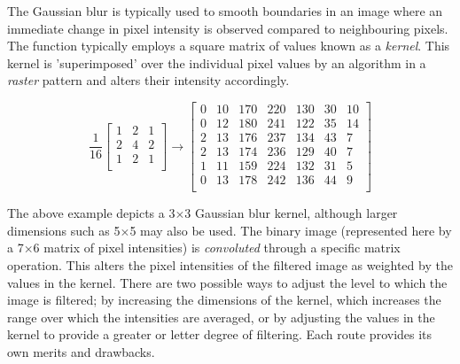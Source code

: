 \documentclass{article}
\begin{document}
	\noindent The Gaussian blur is typically used to smooth boundaries in an image where an immediate change in pixel intensity is observed compared to neighbouring pixels. The function typically employs a square matrix of values known as a \textit{kernel}. This kernel is 'superimposed' over the individual pixel values by an algorithm in a \textit{raster} pattern and alters their intensity accordingly.
	
	\[
	\frac{1}{16}
	\begin{bmatrix} 
		1 & 2 & 1 \\
		2 & 4 & 2\\
		1 & 2 & 1 \\
	\end{bmatrix}
	\longrightarrow
	\begin{bmatrix}
		0 & 10 & 170 & 220 & 130 & 30 & 10\\
		0 & 12 & 180 & 241 & 122 & 35 & 14\\
		2 & 13 & 176 & 237 & 134 & 43 & 7\\
		2 & 13 & 174 & 236 & 129 & 40 & 7\\
		1 & 11 & 159 & 224 & 132 & 31 & 5\\
		0 & 13 & 178 & 242 & 136 & 44 & 9\\
	\end{bmatrix}
	\]
	
	\noindent The above example depicts a 3$\times$3 Gaussian blur kernel, although larger dimensions such as 5$\times$5 may also be used. The binary image (represented here by a 7$\times$6 matrix of pixel intensities) is \textit{convoluted} through a specific matrix operation. This alters the pixel intensities of the filtered image as weighted by the values in the kernel. There are two possible ways to adjust the level to which the image is filtered; by increasing the dimensions of the kernel, which increases the range over which the intensities are averaged, or by adjusting the values in the kernel to provide a greater or letter degree of filtering. Each route provides its own merits and drawbacks.
	\\
	
\end{document}
